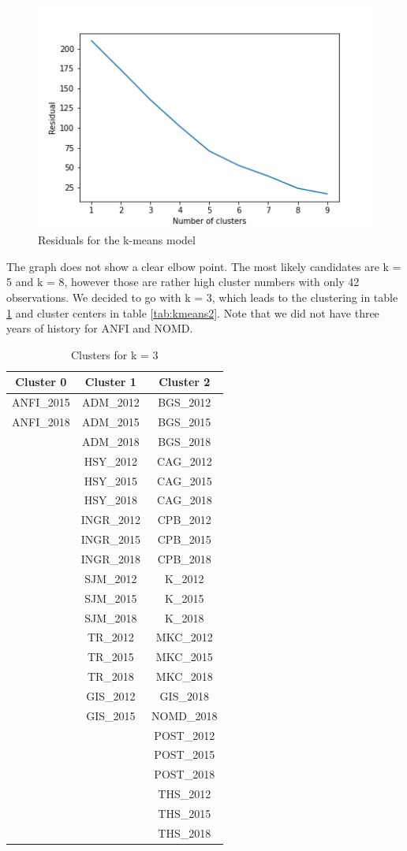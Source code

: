 \documentclass{article}
\begin{document}
\begin{figure}[!ht]
    \centering
    \includegraphics[width = 0.6\linewidth]{kmeans}
    \caption{Residuals for the k-means model}
    \label{fig:kmeans}
\end{figure}

The graph does not show a clear elbow point. The most likely candidates are k = 5 and k = 8, however those are rather high cluster numbers with only 42 observations. We decided to go with k = 3, which leads to the clustering in table \ref{tab:kmeans1} and cluster centers in table \ref{tab:kmeans2}. Note that we did not have three years of history for ANFI and NOMD.

\begin{table}[htb]
    \centering
    \begin{tabular}{c|c|c}
        \textbf{Cluster 0} & \textbf{Cluster 1} & \textbf{Cluster 2}\\
        \hline
        ANFI\_2015 & ADM\_2012 & BGS\_2012 \\
        ANFI\_2018 & ADM\_2015 & BGS\_2015 \\
        & ADM\_2018 & BGS\_2018 \\
        & HSY\_2012 & CAG\_2012 \\
        & HSY\_2015 & CAG\_2015 \\
        & HSY\_2018 & CAG\_2018 \\
        & INGR\_2012 & CPB\_2012 \\
        & INGR\_2015 & CPB\_2015 \\
        & INGR\_2018 & CPB\_2018 \\
        & SJM\_2012 & K\_2012 \\
        & SJM\_2015 & K\_2015 \\
        & SJM\_2018 & K\_2018 \\
        & TR\_2012 & MKC\_2012 \\
        & TR\_2015 & MKC\_2015 \\
        & TR\_2018 & MKC\_2018 \\
        & GIS\_2012 & GIS\_2018 \\
        & GIS\_2015 & NOMD\_2018 \\
        & & POST\_2012 \\
        & & POST\_2015 \\
        & & POST\_2018 \\
        & & THS\_2012 \\
        & & THS\_2015 \\
        & & THS\_2018 
    \end{tabular}
    \caption{Clusters for k = 3}
    \label{tab:kmeans1}
\end{table}
\end{document}
